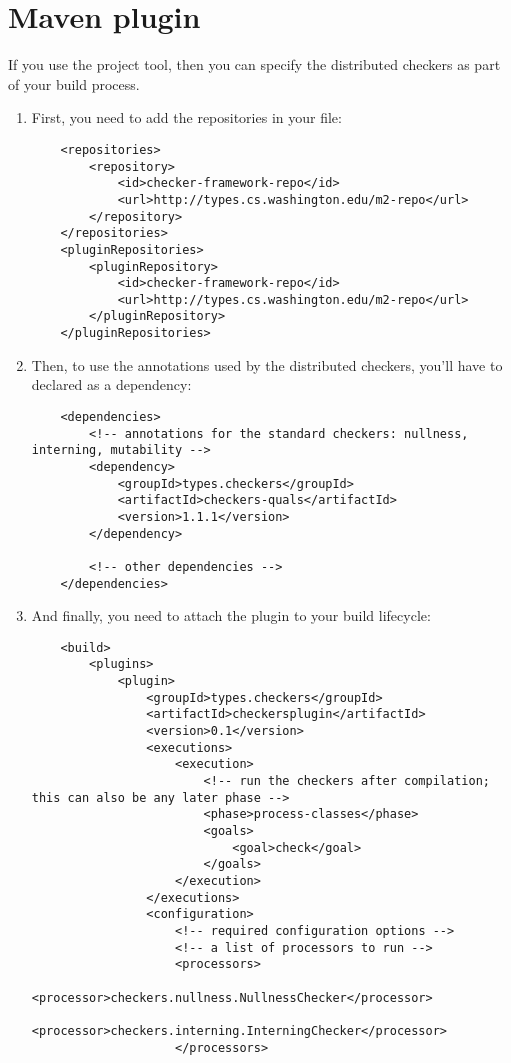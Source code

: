 \section{Maven plugin\label{maven-plugin}}

If you use the  project tool,
then you can specify the distributed checkers as part of your build
process.

\begin{enumerate}

\item First, you need to add the repositories in your  file:

\begin{Verbatim}
    <repositories>
        <repository>
            <id>checker-framework-repo</id>
            <url>http://types.cs.washington.edu/m2-repo</url>
        </repository>
    </repositories>
    <pluginRepositories>
        <pluginRepository>
            <id>checker-framework-repo</id>
            <url>http://types.cs.washington.edu/m2-repo</url>
        </pluginRepository>
    </pluginRepositories>
\end{Verbatim}

\item Then, to use the annotations used by the distributed checkers, you'll
have to declared as a dependency:

\begin{Verbatim}
    <dependencies>
        <!-- annotations for the standard checkers: nullness, interning, mutability -->
        <dependency>
            <groupId>types.checkers</groupId>
            <artifactId>checkers-quals</artifactId>
            <version>1.1.1</version>
        </dependency>

        <!-- other dependencies -->
    </dependencies>
\end{Verbatim}

\item And finally, you need to attach the plugin to your build lifecycle:

\begin{Verbatim}
    <build>
        <plugins>
            <plugin>
                <groupId>types.checkers</groupId>
                <artifactId>checkersplugin</artifactId>
                <version>0.1</version>
                <executions>
                    <execution>
                        <!-- run the checkers after compilation; this can also be any later phase -->
                        <phase>process-classes</phase>
                        <goals>
                            <goal>check</goal>
                        </goals>
                    </execution>
                </executions>
                <configuration>
                    <!-- required configuration options -->
                    <!-- a list of processors to run -->
                    <processors>
                        <processor>checkers.nullness.NullnessChecker</processor>
                        <processor>checkers.interning.InterningChecker</processor>
                    </processors>



\end{Verbatim}
\end{enumerate}
